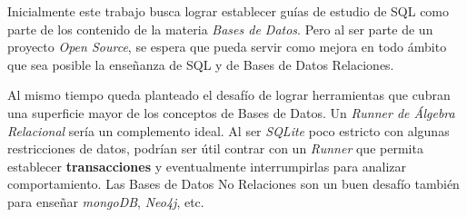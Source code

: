 
Inicialmente este trabajo busca lograr establecer guías de
estudio de SQL como parte de los contenido de la materia \textit{Bases de Datos}.
Pero al ser parte de un proyecto \textit{Open Source}, se espera
que pueda servir como mejora en todo ámbito que sea posible
la enseñanza de SQL y de Bases de Datos Relaciones.

Al mismo tiempo queda planteado el desafío de lograr
herramientas que cubran una superficie mayor de los conceptos
de Bases de Datos. Un \textit{Runner de Álgebra Relacional}
sería un complemento ideal. Al ser \textit{SQLite} poco
estricto con algunas restricciones de datos, podrían
ser útil contrar con un \textit{Runner} que permita
establecer \textbf{transacciones} y eventualmente interrumpirlas
para analizar comportamiento.
Las Bases de Datos No Relaciones son un buen desafío
también para enseñar \textit{mongoDB}, \textit{Neo4j}, etc.
